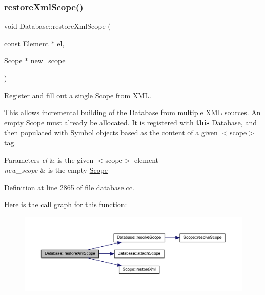 \subsubsection{\texorpdfstring{restoreXmlScope()}{restoreXmlScope()}}
{\footnotesize\ttfamily void Database\+::restore\+Xml\+Scope (\begin{DoxyParamCaption}\item[{const \mbox{\hyperlink{class_element}{Element}} $\ast$}]{el,  }\item[{\mbox{\hyperlink{class_scope}{Scope}} $\ast$}]{new\+\_\+scope }\end{DoxyParamCaption})}



Register and fill out a single \mbox{\hyperlink{class_scope}{Scope}} from X\+ML. 

This allows incremental building of the \mbox{\hyperlink{class_database}{Database}} from multiple X\+ML sources. An empty \mbox{\hyperlink{class_scope}{Scope}} must already be allocated. It is registered with {\bfseries{this}} \mbox{\hyperlink{class_database}{Database}}, and then populated with \mbox{\hyperlink{class_symbol}{Symbol}} objects based as the content of a given $<$scope$>$ tag. 
\begin{DoxyParams}{Parameters}
{\em el} & is the given $<$scope$>$ element \\
\hline
{\em new\+\_\+scope} & is the empty \mbox{\hyperlink{class_scope}{Scope}} \\
\hline
\end{DoxyParams}


Definition at line 2865 of file database.\+cc.

Here is the call graph for this function\+:
\nopagebreak
\begin{figure}[H]
\begin{center}
\leavevmode
\includegraphics[width=350pt]{class_database_a2ced34f8773df5ae0df973a6f84c1495_cgraph}
\end{center}
\end{figure}
\mbox{\label{class_database_ae44b2d77910ea8fd574443e5d7da55e9}} 
